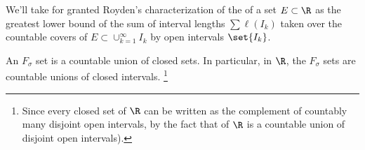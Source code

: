 \documentclass[onesided]{ccg-pset}
\author{Colton Grainger}
\date{2019-09-20}
\begin{document}
\maketitle

\begin{defn}
    \label{def:outer_measure}
    We'll take for granted Royden's characterization \cite{RF10} of the  of a set $E \subset \R$ as the greatest lower bound of the sum of interval lengths $\sum \ell(I_k)$ taken over the countable covers of $E \subset \cup_{k=1}^\infty I_k$ by open intervals $\set{I_k}$.
\end{defn}

\begin{defn}
    \label{defn:_f__sigma_sets}
    An $F_\sigma$ set is a countable union of closed sets. In particular, in $\R$, the $F_\sigma$ sets are countable unions of closed intervals.%
        \footnote{%
        Since every closed set of $\R$ can be written as the complement of countably many disjoint open intervals, by the fact that  of $\R$ is a countable union of disjoint open intervals).
        }
\end{defn}
\end{document}
